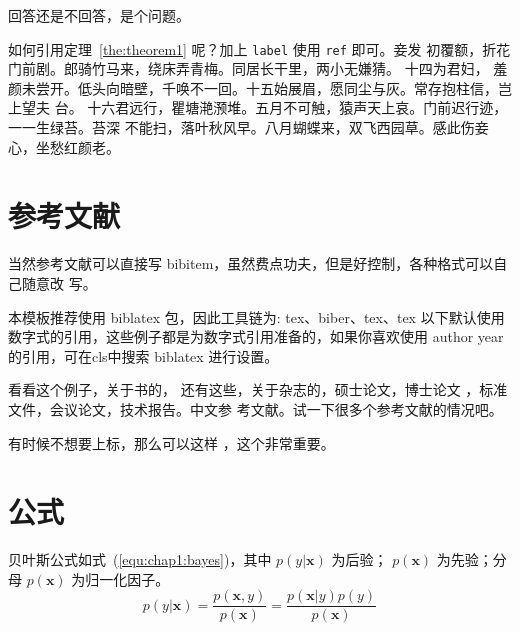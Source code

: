 \begin{problem}
 回答还是不回答，是个问题。
\end{problem}

如何引用定理~\ref{the:theorem1} 呢？加上 \verb|label| 使用 \verb|ref| 即可。妾发
初覆额，折花门前剧。郎骑竹马来，绕床弄青梅。同居长干里，两小无嫌猜。 十四为君妇，
羞颜未尝开。低头向暗壁，千唤不一回。十五始展眉，愿同尘与灰。常存抱柱信，岂上望夫
台。 十六君远行，瞿塘滟滪堆。五月不可触，猿声天上哀。门前迟行迹，一一生绿苔。苔深
不能扫，落叶秋风早。八月蝴蝶来，双飞西园草。感此伤妾心，坐愁红颜老。

\section{参考文献}
\label{sec:bib}
当然参考文献可以直接写 bibitem，虽然费点功夫，但是好控制，各种格式可以自己随意改
写。

本模板推荐使用 biblatex 包，因此工具链为: tex、biber、tex、tex
以下默认使用数字式的引用，这些例子都是为数字式引用准备的，如果你喜欢使用 author year 的引用，可在cls中搜索 biblatex 进行设置。

看看这个例子，关于书的\cite{tex, companion,
ColdSources}， 还有这些\cite{Krasnogor2004e, clzs,
zjsw}，关于杂志的\cite{ELIDRISSI94,
  MELLINGER96, SHELL02}，硕士论文\cite{zhubajie, metamori2004}，博士论文
\cite{shaheshang, FistSystem01}，标准文件\cite{IEEE-1363}，会议论文\cite{DPMG,kocher99}，技术报告\cite{NPB2}。中文参
考文献\cite{cnarticle}。试一下很多个参考文献的情况吧\cite{BogdanSLOPEAdaptiveVariable2014,GossmannIdentificationsignificantgenetic2015,AlbrechtTopologicalapproachfuzzy1999,AlbrechtTopologicalConceptsHierarchies2001,AlbrechtTopologicaltheoryfuzziness1999,MoriasiModelevaluationguidelines2007,Jdatamodels2003}。

有时候不想要上标，那么可以这样 \parencite{shaheshang}，这个非常重要。%



\section{公式}
\label{sec:equation}
贝叶斯公式如式~(\ref{equ:chap1:bayes})，其中 $p(y|\mathbf{x})$ 为后验；
$p(\mathbf{x})$ 为先验；分母 $p(\mathbf{x})$ 为归一化因子。
\begin{equation}
\label{equ:chap1:bayes}
p(y|\mathbf{x}) = \frac{p(\mathbf{x},y)}{p(\mathbf{x})}=
\frac{p(\mathbf{x}|y)p(y)}{p(\mathbf{x})}
\end{equation}

